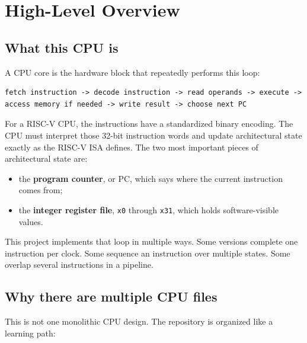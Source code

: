 \section{High-Level Overview}

\subsection{What this CPU is}

A CPU core is the hardware block that repeatedly performs this loop:

\begin{lstlisting}[language={}]
fetch instruction -> decode instruction -> read operands -> execute -> access memory if needed -> write result -> choose next PC
\end{lstlisting}

For a RISC-V CPU, the instructions have a standardized binary encoding. The CPU must interpret those 32-bit instruction words and update architectural state exactly as the RISC-V ISA defines. The two most important pieces of architectural state are:

\begin{itemize}
\item the \textbf{program counter}, or PC, which says where the current instruction comes from;
\item the \textbf{integer register file}, \texttt{x0} through \texttt{x31}, which holds software-visible values.
\end{itemize}
This project implements that loop in multiple ways. Some versions complete one instruction per clock. Some sequence an instruction over multiple states. Some overlap several instructions in a pipeline.

\subsection{Why there are multiple CPU files}

This is not one monolithic CPU design. The repository is organized like a learning path:

